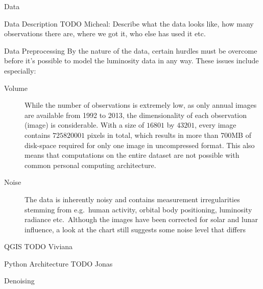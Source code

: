 \documentclass[12pt,fleqn,leqno,letterpaper]{article}
\begin{document}
\begin{section}{Data}
  \begin{subsection}{Data Description}
    TODO Micheal: Describe what the data looks like, how many observations there are, where we got it, who else has used it etc.
  \end{subsection}
  \begin{subsection}{Data Preprocessing}
    By the nature of the data, certain hurdles must be overcome before it's possible to model the luminosity data in any way. These issues include especially:
    \begin{description}
      \item[Volume]{While the number of observations is extremely low, as only annual images are available from 1992 to 2013, the dimensionality of each observation (image) is considerable. With a size of $16801$ by $43201$, every image contains $725820001$ pixels in total, which results in more than 700MB of disk-space required for only one image in uncompressed format. This also means that computations on the entire dataset are not possible with common personal computing architecture.}
      \item[Noise]{The data is inherently noisy and contains measurement irregularities stemming from e.g.\ human activity, orbital body positioning, luminosity radiance etc.\ Although the images have been corrected for solar and lunar influence, a look at the chart still suggests some noise level that differs}
    \end{description}
    \begin{subsubsection}{QGIS}
      TODO Viviana
    \end{subsubsection}
    \begin{subsubsection}{Python Architecture}
      TODO Jonas
    \end{subsubsection}
    \begin{subsubsection}{Denoising}
    \end{subsubsection}
  \end{subsection}
\end{section}
\end{document}
